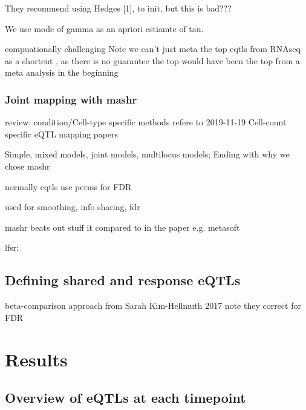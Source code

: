 They recommend using Hedges [1], to init, but this is bad???

We use mode of gamma as an apriori estiamte of tau.

compuationally challenging
Note we can't just meta the top eqtls from RNAseq as a shortcut , as there is no guarantee the top would have been the top from a meta analysis in the beginning

\subsubsection{Joint mapping with mashr}


review: condition/Cell-type specific methods
refere to 2019-11-19 Cell-count specific eQTL mapping papers

Simple, mixed models, joint models, multilocus models; Ending with why we chose mashr

normally eqtls use perms for FDR

used for smoothing, info sharing, fdr

mashr beats out stuff it compared to in the paper e.g. metasoft

lfsr:


\subsection{Defining shared and response eQTLs}

beta-comparison approach from Sarah Kim-Hellmuth 2017
    note they correct for FDR

\section{Results}

\subsection{Overview of eQTLs at each timepoint}

